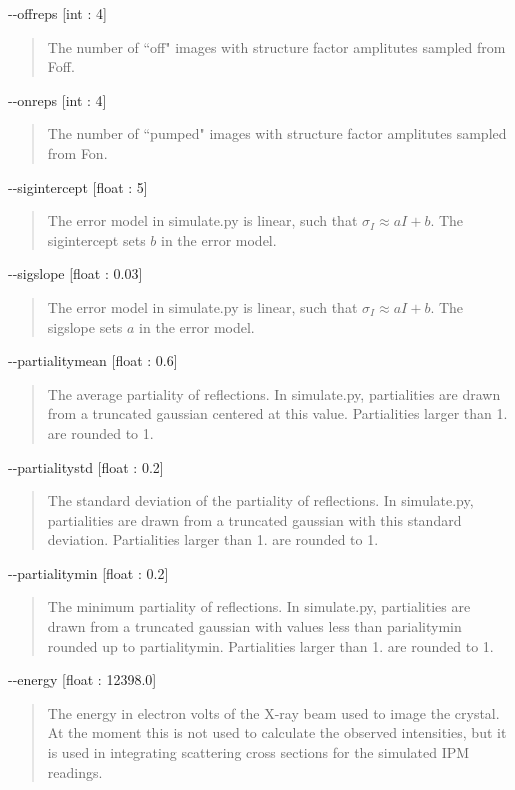 \documentclass{report}
\begin{document}
\noindent
-{}-offreps [int : 4]
\begin{quote}
    The number of ``off" images with structure factor amplitutes sampled from Foff.
\end{quote}

\noindent
-{}-onreps [int : 4]
\begin{quote}
    The number of ``pumped" images with structure factor amplitutes sampled from Fon. 
\end{quote}

\noindent
-{}-sigintercept [float : 5]
\begin{quote}
    The error model in simulate.py is linear, such that $\sigma_I \approx aI + b$. 
    The sigintercept sets $b$ in the error model. 
\end{quote}

\noindent
-{}-sigslope [float : 0.03]
\begin{quote}
    The error model in simulate.py is linear, such that $\sigma_I \approx aI + b$. 
    The sigslope sets $a$ in the error model. 
\end{quote}

\noindent
-{}-partialitymean [float : 0.6]
\begin{quote}
    The average partiality of reflections.
    In simulate.py, partialities are drawn from a truncated gaussian centered at this value. 
    Partialities larger than 1. are rounded to 1. 
\end{quote}

\noindent
-{}-partialitystd [float : 0.2]
\begin{quote}
    The standard deviation of the partiality of reflections.
    In simulate.py, partialities are drawn from a truncated gaussian with this standard deviation.
    Partialities larger than 1. are rounded to 1. 
\end{quote}

\noindent
-{}-partialitymin [float : 0.2]
\begin{quote}
    The minimum partiality of reflections.
    In simulate.py, partialities are drawn from a truncated gaussian with values less than parialitymin rounded up to partialitymin.
    Partialities larger than 1. are rounded to 1. 
\end{quote}

\noindent
-{}-energy [float : 12398.0]
\begin{quote}
    The energy in electron volts of the X-ray beam used to image the crystal. 
    At the moment this is not used to calculate the observed intensities, but it is used in integrating scattering cross sections for the simulated IPM readings.
\end{quote}
\end{document}
